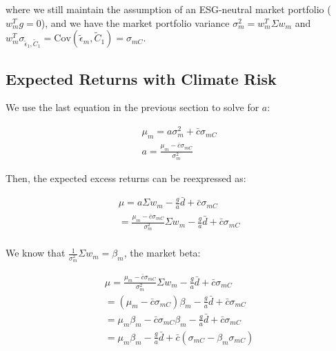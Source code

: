 where we still maintain the assumption of an ESG-neutral market portfolio ($w_m^Tg = 0$),
and we have the market portfolio variance 
$\sigma^2_m = w_m^T \Sigma w_m$ and 
$w_m^T \sigma_{\tilde{\epsilon}_1, \tilde{C}_1} = \text{Cov}(\tilde{\epsilon}_m, \tilde{C}_1) = \sigma_{mC}$.

\subsection{Expected Returns with Climate Risk}


We use the last equation in the previous section 
to solve for $a$:

\begin{equation}
    \begin{aligned}
        \mu_m = a \sigma^2_m + \bar{c} \sigma_{mC} \\
        a = \frac{\mu_m - \bar{c} \sigma_{mC}}{\sigma^2_m}
    \end{aligned}
\end{equation}

Then, the expected excess returns can be reexpressed as:

\begin{equation}
    \begin{aligned}
        \mu = a\Sigma w_m - \frac{g}{a} \bar{d} + \bar{c} \sigma_{mC} \\
        = \frac{\mu_m - \bar{c} \sigma_{mC}}{\sigma^2_m} \Sigma w_m - \frac{g}{a} \bar{d} + \bar{c} \sigma_{mC} \\
    \end{aligned}
\end{equation}

We know that $\frac{1}{\sigma^2_m}\Sigma w_m = \beta_m$, 
the market beta:

\begin{equation}
    \begin{aligned}
        \mu =  \frac{\mu_m - \bar{c} \sigma_{mC}}{\sigma^2_m} \Sigma w_m - \frac{g}{a} \bar{d} + \bar{c} \sigma_{mC} \\
        = (\mu_m - \bar{c} \sigma_{mC})\beta_m - \frac{g}{a} \bar{d} + \bar{c} \sigma_{mC}\\
        = \mu_m \beta_m - \bar{c} \sigma_{mC} \beta_m - \frac{g}{a} \bar{d} + \bar{c} \sigma_{mC} \\
        = \mu_m \beta_m - \frac{g}{a} \bar{d} + \bar{c}(\sigma_{mC} - \beta_m \sigma_{mC})
    \end{aligned}
\end{equation}

